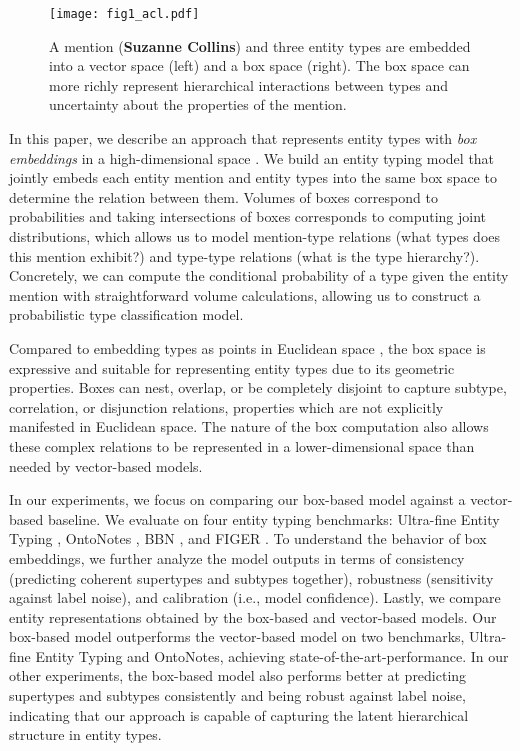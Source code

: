 \documentclass[11pt,a4paper]{article}
\begin{document}
\begin{figure*}[!t]
    \centering
    \texttt{[image: fig1\_acl.pdf]}
    \caption{A mention ({\bf Suzanne Collins}) and three entity types are embedded into a vector space (left) and a box space (right). The box space can more richly represent hierarchical interactions between types and uncertainty about the properties of the mention.}
    \label{fig:box_vs_vec}
    \vspace{-15pt}
\end{figure*}





In this paper, we describe an approach that represents entity types with \emph{box embeddings} in a high-dimensional space \cite{Luke_Vilnis_18}. We build an entity typing model that jointly embeds each entity mention and entity types into the same box space to determine the relation between them. Volumes of boxes correspond to probabilities and taking intersections of boxes corresponds to computing joint distributions, which allows us to model mention-type relations (what types does this mention exhibit?) and type-type relations (what is the type hierarchy?). Concretely, we can compute the conditional probability of a type given the entity mention with straightforward volume calculations, allowing us to construct a probabilistic type classification model.

Compared to embedding types as points in Euclidean space \cite{Xiang_Ren_16a}, the box space is expressive and suitable for representing entity types due to its geometric properties. Boxes can nest, overlap, or be completely disjoint to capture subtype, correlation, or disjunction relations, properties which are not explicitly manifested in Euclidean space. The nature of the box computation also allows these complex relations to be represented in a lower-dimensional space than needed by vector-based models.

In our experiments, we focus on comparing our box-based model against a vector-based baseline. We evaluate on four entity typing benchmarks: Ultra-fine Entity Typing \citep{Eunsol_Choi_18}, OntoNotes \citep{Dan_Gillick_14}, BBN \cite{bbn}, and FIGER \citep{Xiao_Ling_12}. To understand the behavior of box embeddings, we further analyze the model outputs in terms of consistency (predicting coherent supertypes and subtypes together), robustness (sensitivity against label noise), and calibration (i.e., model confidence). Lastly, we compare entity representations obtained by the box-based and vector-based models. Our box-based model outperforms the vector-based model on two benchmarks, Ultra-fine Entity Typing and OntoNotes, achieving state-of-the-art-performance. In our other experiments, the box-based model also performs better at predicting supertypes and subtypes consistently and being robust against label noise, indicating that our approach is capable of capturing the latent hierarchical structure in entity types.
\end{document}
